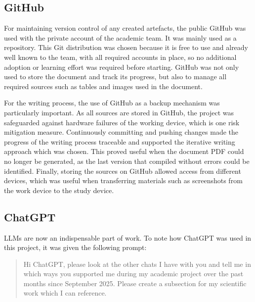 \subsection*{GitHub}
For maintaining version control of any created artefacts, the public GitHub was used with the private account of the academic team. It was mainly used as a repository. This Git distribution was chosen because it is free to use and already well known to the team, with all required accounts in place, so no additional adoption or learning effort was required before starting. GitHub was not only used to store the document and track its progress, but also to manage all required sources such as tables and images used in the document.

For the writing process, the use of GitHub as a backup mechanism was particularly important. As all sources are stored in GitHub, the project was safeguarded against hardware failures of the working device, which is one risk mitigation measure. Continuously committing and pushing changes made the progress of the writing process traceable and supported the iterative writing approach which was chosen. This proved useful when the document PDF could no longer be generated, as the last version that compiled without errors could be identified. Finally, storing the sources on GitHub allowed access from different devices, which was useful when transferring materials such as screenshots from the work device to the study device.

\subsection*{ChatGPT}
LLMs are now an indispensable part of work. To note how ChatGPT was used in this project, it was given the following prompt:
\begin{quote}
Hi ChatGPT, please look at the other chats I have with you and tell me in which ways you supported me during my academic project over the past months since September 2025. Please create a subsection for my scientific work which I can reference.
\end{quote}

